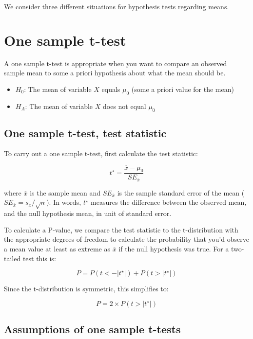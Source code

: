 \documentclass[]{book}
\providecommand{\tightlist}{%
  \setlength{\itemsep}{0pt}\setlength{\parskip}{0pt}}
\theoremstyle{definition}
\theoremstyle{definition}
\theoremstyle{definition}
\theoremstyle{remark}
\begin{document}
We consider three different situations for hypothesis tests regarding
means.

\hypertarget{one-sample-t-test}{%
\section{One sample t-test}\label{one-sample-t-test}}

A one sample t-test is appropriate when you want to compare an observed
sample mean to some a priori hypothesis about what the mean should be.

\begin{itemize}
\tightlist
\item
  \(H_0\): The mean of variable \(X\) equals \(\mu_0\) (some a priori
  value for the mean)
\item
  \(H_A\): The mean of variable \(X\) does not equal \(\mu_0\)
\end{itemize}

\hypertarget{one-sample-t-test-test-statistic}{%
\subsection{One sample t-test, test
statistic}\label{one-sample-t-test-test-statistic}}

To carry out a one sample t-test, first calculate the test statistic:

\[
t^{\star} = \frac{\overline{x} - \mu_0}{SE_{\overline{x}}}
\]

where \(\overline{x}\) is the sample mean and \(SE_{\overline{x}}\) is
the sample standard error of the mean
(\(SE_{\overline{x}} = s_x/\sqrt{n}\)). In words, \(t^{\star}\) measures
the difference between the observed mean, and the null hypothesis mean,
in unit of standard error.

To calculate a P-value, we compare the test statistic to the
t-distribution with the appropriate degrees of freedom to calculate the
probability that you'd observe a mean value at least as extreme as
\(\overline{x}\) if the null hypothesis was true. For a two-tailed test
this is:

\[
P = P(t < -|t^\star|) + P(t > |t^\star|)
\]

Since the t-distribution is symmetric, this simplifies to:

\[
P = 2 \times P(t > |t^\star|)
\]

\hypertarget{assumptions-of-one-sample-t-tests}{%
\subsection{Assumptions of one sample
t-tests}\label{assumptions-of-one-sample-t-tests}}
\end{document}
